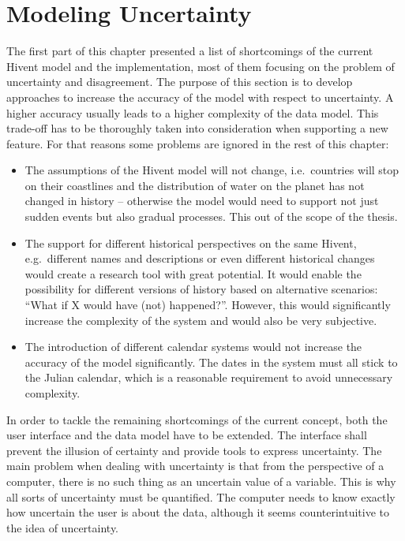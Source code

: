


\section{Modeling Uncertainty} %
\label{sec:modelling_uncertainty}

The first part of this chapter presented a list of shortcomings of the current Hivent model and the implementation, most of them focusing on the problem of uncertainty and disagreement. The purpose of this section is to develop approaches to increase the accuracy of the model with respect to uncertainty. A higher accuracy usually leads to a higher complexity of the data model. This trade-off has to be thoroughly taken into consideration when supporting a new feature. For that reasons some problems are ignored in the rest of this chapter:

\begin{itemize}
  \item The assumptions of the Hivent model will not change, i.e.\ countries will stop on their coastlines and the distribution of water on the planet has not changed in history -- otherwise the model would need to support not just sudden events but also gradual processes. This out of the scope of the thesis.
  \item The support for different historical perspectives on the same Hivent, e.g.\ different names and descriptions or even different historical changes would create a research tool with great potential. It would enable the possibility for different versions of history based on alternative scenarios: ``What if X would have (not) happened?''. However, this would significantly increase the complexity of the system and would also be very subjective.
  \item The introduction of different calendar systems would not increase the accuracy of the model significantly. The dates in the system must all stick to the Julian calendar, which is a reasonable requirement to avoid unnecessary complexity.
\end{itemize}

In order to tackle the remaining shortcomings of the current concept, both the user interface and the data model have to be extended. The interface shall prevent the illusion of certainty and provide tools to express uncertainty. The main problem when dealing with uncertainty is that from the perspective of a computer, there is no such thing as an uncertain value of a variable. This is why all sorts of uncertainty must be quantified. The computer needs to know exactly how uncertain the user is about the data, although it seems counterintuitive to the idea of uncertainty.

